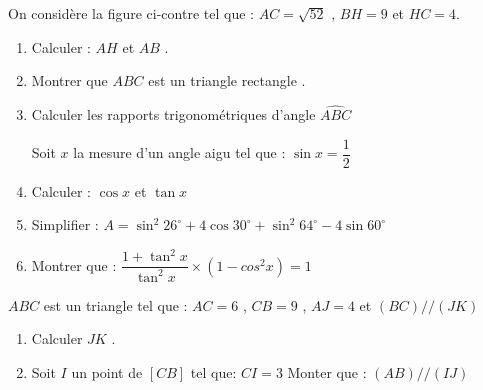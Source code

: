 \documentclass[a4paper,12pt]{article}
\begin{document}
\begin{exo}
\begin{minipage}{0.6\linewidth}
 On considère la figure ci-contre tel que : $AC=\sqrt{52}$ , $BH=9$ et $HC=4$.
\begin{enumerate}
\item Calculer : $AH$ et $AB$ .
\item Montrer que $ABC$ est un triangle rectangle .
\item Calculer les rapports trigonométriques d'angle $\widehat{ABC}$

Soit $x$ la mesure d'un angle aigu tel que : $\sin x =\dfrac{1}{2}$
\item Calculer : $\cos x$ et $\tan x$
\item Simplifier  :
$A = \sin^{2}26^{\circ} +4\cos30^{\circ} +\sin^{2}64^{\circ}-4\sin60^{\circ} $
\item Montrer que : $\dfrac{1+\tan^{2}x}{\tan^{2}x}\times (1-cos^{2}x)=1$
\end{enumerate}
\end{minipage}
\begin{minipage}{0.4\linewidth}
\end{minipage}
\end{exo}

\begin{exo}
\begin{minipage}{0.5\linewidth}
$ABC$ est un triangle tel que : $AC=6$ , $CB=9$ , $AJ=4$  et $(BC)//(JK)$
\begin{enumerate}
\item Calculer  $JK$ .
\item Soit $I$ un point de $[CB] $ tel que: $CI=3$\newline
Monter que : $(AB)//(IJ)$
\end{enumerate}
\end{minipage}
\begin{minipage}{0.5\linewidth}
\end{minipage}
\end{exo}
\end{document}
